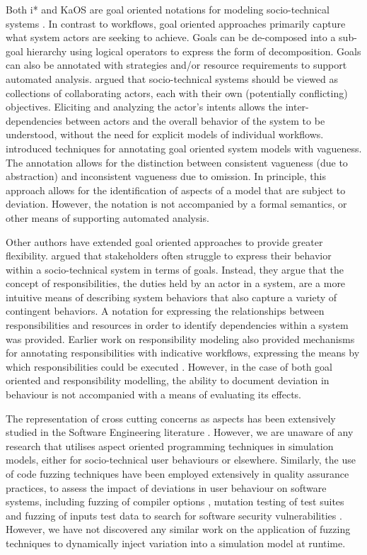 \documentclass{llncs}
\begin{document}
Both i* \citep{yu1995social} and KaOS \citep{dardenne93goal} are goal oriented notations for modeling socio-technical
systems \cite{werneck2009goreistarkaos}.  In contrast to workflows, goal oriented approaches primarily capture what
system actors are seeking to achieve.  Goals can be de-composed into a sub-goal hierarchy using logical operators to
express the form of decomposition. Goals can also be annotated with strategies and/or resource requirements to support
automated analysis.  \citet{yu1995social} argued that socio-technical systems should be viewed as collections of
collaborating actors, each with their own (potentially conflicting) objectives.  Eliciting and analyzing the actor’s
intents allows the inter-dependencies between actors and the overall behavior of the system to be understood, without
the need for explicit models of individual workflows. \citet{herrmann1999vagueness} introduced techniques for annotating
goal oriented system models with vagueness.  The annotation allows for the distinction between consistent vagueness (due
to abstraction) and inconsistent vagueness due to omission.  In principle, this approach allows for the identification
of aspects of a model that are subject to deviation.  However, the notation is not accompanied by a formal semantics,
or other means of supporting automated analysis.

Other authors have extended goal oriented approaches to provide greater flexibility. \citet{sommerville09deriving}
argued that stakeholders often struggle to express their behavior within a socio-technical system in terms of goals.
Instead, they argue that the concept of responsibilities, the duties held by an actor in a system, are a more intuitive
means of describing system behaviors that also capture a variety of contingent behaviors.  A notation for expressing the
relationships between responsibilities and resources in order to identify dependencies within a system was provided.
Earlier work on responsibility modeling also provided mechanisms for annotating responsibilities with indicative
workflows, expressing the means by which responsibilities could be executed \citep{dewsbury07responsibility}.  However,
in the case of both goal oriented and responsibility modelling, the ability to document deviation in behaviour is not
accompanied with a means of evaluating its effects.

The representation of cross cutting concerns as aspects has been extensively studied in the Software Engineering
literature \citep{Ali2012Aspect}.  However, we are unaware of any research that utilises aspect oriented programming
techniques in simulation models, either for socio-technical user behaviours or elsewhere.  Similarly, the use of code
fuzzing techniques have been employed extensively in quality assurance practices, to assess the impact of deviations in user
behaviour on software systems, including fuzzing of compiler options \citep{fuzzing-compiler}, mutation testing of test
suites \cite{demillo78hints} and fuzzing of inputs test data to search for software security vulnerabilities
\citep{takanen08fuzzing}.  However, we have not discovered any similar work on the application of fuzzing techniques to
dynamically inject variation into a simulation model at runtime.
\end{document}
